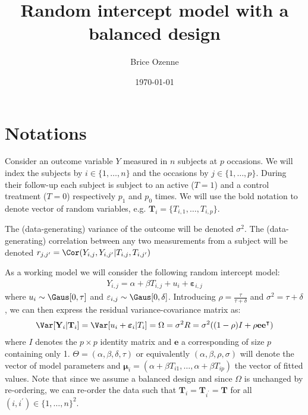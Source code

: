 \documentclass[12pt]{article}
\author{Brice Ozenne}
\date{\today}
\title{Random intercept model with a balanced design}
\newcommand\Ve{\mathbf{e}}
\newcommand\VT{\mathbf{T}}
\newcommand\VY{\mathbf{Y}}
\newcommand\Vvarepsilon{\boldsymbol{\varepsilon}}
\newcommand\Vmu{\boldsymbol{\mu}}
\newcommand\trans[1]{{#1}^\intercal}%
\begin{document}
\maketitle


\section{Notations}
\label{sec:org36117c2}

Consider an outcome variable \(Y\) measured in \(n\) subjects at \(p\)
occasions. We will index the subjects by \(i \in \{1,\ldots,n\}\) and
the occasions by \(j \in \{1,\ldots,p\}\). During their follow-up each
subject is subject to an active (\(T=1\)) and a control treatment
(\(T=0\)) respectively \(p_1\) and \(p_0\) times. We will use the bold
notation to denote vector of random variables, e.g.
\(\VT_i=\{T_{i,1},\ldots,T_{i,p}\}\).

\bigskip

The (data-generating) variance of the outcome will be denoted
\(\sigma^2\). The (data-generating) correlation between any two
measurements from a subject will be denoted \(r_{j,j^{\prime}} = \Cor(Y_{i,j},Y_{i,j^{\prime}}|T_{i,j},T_{i,j^{\prime}})\)

\bigskip

As a working model we will consider the following random intercept
model:
\begin{align*}
Y_{i,j} = \alpha + \beta T_{i,j} + u_i + \Vvarepsilon_{i,j}
\end{align*}
where \(u_i \sim \Gaus[0,\tau]\) and \(\varepsilon_{i,j} \sim
\Gaus[0,\delta]\). Introducing \(\rho = \frac{\tau}{\tau+\delta}\) and
\(\sigma^2=\tau+\delta\), we can then express the residual
variance-covariance matrix as:
\begin{align*}
\Var[\VY_{i}|\VT_i] = \Var[u_{i} + \Vvarepsilon_{i}|T_i] = \Omega = \sigma^2 R = \sigma^2 ((1-\rho) I + \rho \Ve\trans{\Ve})
\end{align*}
where \(I\) denotes the \(p \times p\) identity matrix and \(\Ve\) a
corresponding of size \(p\) containing only 1. \(\Theta =
(\alpha,\beta,\delta,\tau)\) or equivalently
\((\alpha,\beta,\rho,\sigma)\) will denote the vector of model
parameters and \(\Vmu_{i}=\left(\alpha+\beta
T_{i1},\ldots,\alpha+\beta T_{ip}\right)\) the vector of fitted
values. Note that since we assume a balanced design and since
\(\Omega\) is unchanged by re-ordering, we can re-order the data such
that \(\VT_i=\VT_{i^{\prime}}=\VT\) for all \((i,i^{\prime})\in\{1,\ldots,n\}^2\).
\end{document}
